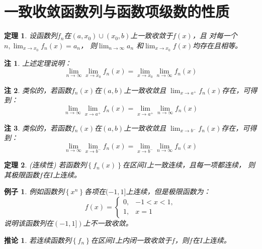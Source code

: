 \documentclass[a4paper,12pt]{article}
\newtheorem{theorem}{定理}
\newtheorem{example}{例子}
\newtheorem{corollary}{推论}
\newtheorem{remark}{注}
\begin{document}
\section{一致收敛函数列与函数项级数的性质}
\begin{theorem}
    设函数列$\displaystyle f_n$在$(a,x_0) \cup (x_0, b)$上一致收敛于$f(x)$，且
    对每一个$ \displaystyle n, \lim_{x \to x_0}f_n(x) = a_n$，
    则$\displaystyle \lim_{n \to \infty} a_n$
    和$\lim_{x \to x_0}f(x)$均存在且相等。
\end{theorem}

\begin{remark}
    上述定理说明：
    \begin{equation}
        \lim_{n \to \infty}\lim_{x \to x_0}f_n(x) = \lim_{x \to x_0}\lim_{n \to \infty}f_n(x)
        \label{eq:eq9}
    \end{equation}
\end{remark}
\begin{remark}
    类似的，若函数$\displaystyle f_n(x)$在$(a,b)$上一致收敛且
    $\displaystyle \lim_{x \to a^+}f_n(x)$存在，可得到：
    \[
        \lim_{n \to \infty}\lim_{x \to a^+}f_n(x) = \lim_{x \to a^+}\lim_{n \to \infty}f_n(x)
        \]
\end{remark}
\begin{remark}
    类似的，若函数$\displaystyle f_n(x)$在$(a,b)$上一致收敛且
    $\displaystyle \lim_{x \to b^-}f_n(x)$存在，可得到：
    \[
        \lim_{n \to \infty}\lim_{x \to b^-}f_n(x) = \lim_{x \to b^-}\lim_{n \to \infty}f_n(x)
        \]
\end{remark}

\begin{theorem}{\rm (连续性)}
    若函数列$\displaystyle \left\{f_n(x)\right\}$在区间$I$上一致连续，且每一项都连续，
    则其极限函数$f$在$I$上连续。
\end{theorem}

\begin{example}
    例如函数列$\displaystyle \left\{x^n\right\}$各项在$(-1, 1]$上连续，但是极限函数为：
     \[
         f(x) = \left\{\begin{array}{ll} 0, & -1 < x < 1, \\
                                   1, & x = 1 
                 \end{array}\right.
                 \]
             说明该函数列在$(-1,1])$上不一致收敛。
\end{example}

\begin{corollary}
    若连续函数列$\left\{f_n\right\}$在区间$I$上内闭一致收敛于$f$，则$f$在$I$上连续。
\end{corollary}
\end{document}
